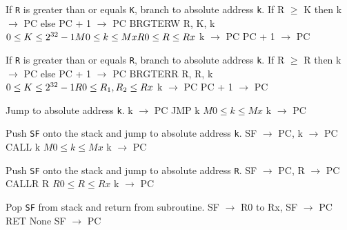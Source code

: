 \documentclass[titlepage]{scrartcl}
\begin{document}
{If \texttt{R} is greater than or equals \texttt{K}, branch to absolute address \texttt{k}.}
{If R $\geq$ K then k $\rightarrow$ PC else PC + 1 $\rightarrow$ PC}
{BRGTERW R, K, k}
{$0 \leq K \leq 2^{32} - 1 \hfill \break M0 \leq k \leq Mx \hfill \break R0 \leq R \leq Rx$}
{k $\rightarrow$ PC \hfill \break PC + 1 $\rightarrow$ PC}
{}
{\srtable{}{}{}{}}

{If \texttt{R} is greater than or equals \texttt{R}, branch to absolute address \texttt{k}.}
{If R $\geq$ R then k $\rightarrow$ PC else PC + 1 $\rightarrow$ PC}
{BRGTERR R, R, k}
{$0 \leq K \leq 2^{32} - 1 \hfill \break R0 \leq R_{1}, R_{2} \leq Rx$}
{k $\rightarrow$ PC \hfill \break PC + 1 $\rightarrow$ PC}
{}
{\srtable{}{}{}{}}

{Jump to absolute address \texttt{k}.}
{k $\rightarrow$ PC}
{JMP k}
{$M0 \leq k \leq Mx$}
{k $\rightarrow$ PC}
{}
{\srtable{}{}{}{}}

{Push \texttt{SF} onto the stack and jump to absolute address \texttt{k}.}
{SF $\rightarrow$ PC, k $\rightarrow$ PC}
{CALL k}
{$M0 \leq k \leq Mx$}
{k $\rightarrow$ PC}
{}
{\srtable{}{}{}{}}

{Push \texttt{SF} onto the stack and jump to absolute address \texttt{R}.}
{SF $\rightarrow$ PC, R $\rightarrow$ PC}
{CALLR R}
{$R0 \leq R \leq Rx$}
{k $\rightarrow$ PC}
{}
{\srtable{}{}{}{}}

{Pop \texttt{SF} from stack and return from subroutine.}
{SF $\rightarrow$ R0 to Rx, SF $\rightarrow$ PC}
{RET}
{None}
{SF $\rightarrow$ PC}
{}
{\srtable{}{}{}{}}

\end{document}
